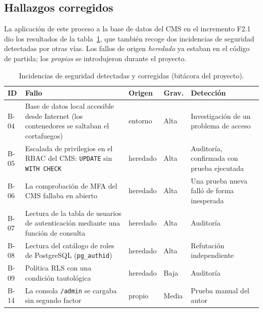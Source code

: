 \subsection{Hallazgos corregidos}

La aplicación de este proceso a la base de datos del CMS en el incremento
F2.1 dio los resultados de la tabla~\ref{tab:hallazgos}, que también recoge
dos incidencias de seguridad detectadas por otras vías. Los fallos de origen
\emph{heredado} ya estaban en el código de partida; los \emph{propios} se
introdujeron durante el proyecto.

\begin{table}[htbp]
  \centering
  \footnotesize
  \caption{Incidencias de seguridad detectadas y corregidas (bitácora del proyecto).}
  \label{tab:hallazgos}
  \begin{tabularx}{\textwidth}{@{}l>{\raggedright\arraybackslash}Xll>{\raggedright\arraybackslash}p{3.1cm}@{}}
    \toprule
    \textbf{ID} & \textbf{Fallo} & \textbf{Origen} & \textbf{Grav.} & \textbf{Detección} \\
    \midrule
    B-04 & Base de datos local accesible desde Internet (los contenedores se saltaban el cortafuegos) & entorno & Alta & Investigación de un problema de acceso \\
    B-05 & Escalada de privilegios en el RBAC del CMS: \texttt{UPDATE} sin \texttt{WITH CHECK} & heredado & Alta & Auditoría, confirmada con prueba ejecutada \\
    B-06 & La comprobación de MFA del CMS fallaba en abierto & heredado & Alta & Una prueba nueva falló de forma inesperada \\
    B-07 & Lectura de la tabla de usuarios de autenticación mediante una función de consulta & heredado & Alta & Auditoría \\
    B-08 & Lectura del catálogo de roles de PostgreSQL (\texttt{pg\_authid}) & heredado & Alta & Refutación independiente \\
    B-09 & Política RLS con una condición tautológica & heredado & Baja & Auditoría \\
    B-14 & La consola \texttt{/admin} se cargaba sin segundo factor & propio & Media & Prueba manual del autor \\
    \bottomrule
  \end{tabularx}
\end{table}

